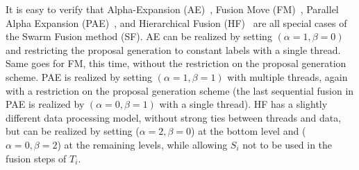 \noindent It is easy to verify that Alpha-Expansion
(AE)~\cite{alpha_expansion}, Fusion Move (FM)~\cite{viktor}, Parallel
Alpha Expansion (PAE)~\cite{delong}, and Hierarchical Fusion
(HF)~\cite{delong_hierarchical,olga} are all special cases of the Swarm
Fusion method (SF). AE can be realized by setting $(\alpha=1, \beta=0)$ and
restricting the proposal generation to constant labels with a single
thread. Same goes for FM, this time, without the restriction on the
proposal generation scheme. PAE is realized by setting
$(\alpha=1,\beta=1)$  with multiple threads, again with a restriction on
the proposal generation scheme (the last sequential fusion in PAE is
realized by $(\alpha=0, \beta=1)$ with a single thread).
%
HF has a slightly different data processing model, without strong ties
between threads and data, but can be realized by setting ($\alpha=2,
\beta=0$) at the bottom level and ($\alpha=0, \beta=2$) at the remaining
levels, while allowing $S_i$ not to be used in the fusion steps of
$T_i$.





%

